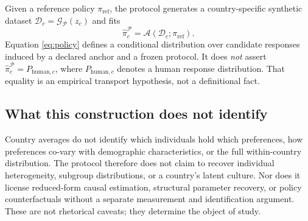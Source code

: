 \documentclass[10pt,letterpaper]{article}
\newcommand{\Pcal}{\mathcal{P}}
\newcommand{\Gcal}{\mathcal{G}}
\newcommand{\Acal}{\mathcal{A}}
\newcommand{\Dcal}{\mathcal{D}}
\begin{document}
Given a reference policy $\pi_{\mathrm{ref}}$, the protocol generates a country-specific synthetic dataset $\Dcal_c=\Gcal_{\Pcal}(z_c)$ and fits
\begin{equation}
\widehat\pi_c^{\Pcal}=\Acal\!\left(\Dcal_c;\pi_{\mathrm{ref}}\right).
\label{eq:policy}
\end{equation}
Equation \eqref{eq:policy} defines a conditional distribution over candidate responses induced by a declared anchor and a frozen protocol. It does \emph{not} assert $\widehat\pi_c^{\Pcal}=P_{\mathrm{human},c}$, where $P_{\mathrm{human},c}$ denotes a human response distribution. That equality is an empirical transport hypothesis, not a definitional fact.

\subsection{What this construction does not identify}\label{sec:boundary}
Country averages do not identify which individuals hold which preferences, how preferences co-vary with demographic characteristics, or the full within-country distribution. The protocol therefore does not claim to recover individual heterogeneity, subgroup distributions, or a country's latent culture. Nor does it license reduced-form causal estimation, structural parameter recovery, or policy counterfactuals without a separate measurement and identification argument. These are not rhetorical caveats; they determine the object of study.
\end{document}
